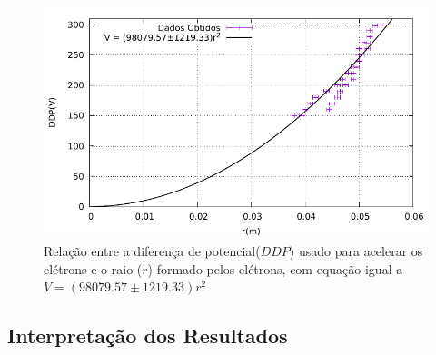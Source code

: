 \begin{figure}[!ht]
	\centering
		\includegraphics[scale= 1.0]{graf/e_m.pdf}
	\caption{Relação entre a diferença de potencial($DDP$) usado para acelerar os elétrons e o raio ($r$) formado pelos elétrons, com equação igual a $V = (98079.57\pm 1219.33)r^2$}
\label{fig}
\end{figure}

\subsection{Interpretação dos Resultados}

